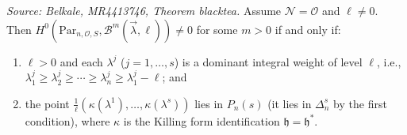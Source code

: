 \begin{theorem}[BlackTea]
  \label{thm:blacktea}
  \textit{Source: Belkale, MR4413746, Theorem blacktea.}
  Assume \(\mathcal{N} = \mathcal{O}\) and \(\ell \neq 0\). Then \(H^0(\mathrm{Par}_{n,\mathcal{O},S}, \mathcal{B}^m(\vec{\lambda}, \ell)) \neq 0\) for some \(m > 0\) if and only if:
  \begin{enumerate}
    \item \(\ell > 0\) and each \(\lambda^j\) (\(j = 1, \ldots, s\)) is a dominant integral weight of level \(\ell\), i.e., \(\lambda^j_1 \geq \lambda^j_2 \geq \cdots \geq \lambda^j_n \geq \lambda^j_1 - \ell\); and
    \item the point \(\frac{1}{\ell}(\kappa(\lambda^1), \ldots, \kappa(\lambda^s))\) lies in \(P_n(s)\) (it lies in \(\Delta_n^s\) by the first condition), where \(\kappa\) is the Killing form identification \(\mathfrak{h} = \mathfrak{h}^*\).
  \end{enumerate}
\end{theorem}

